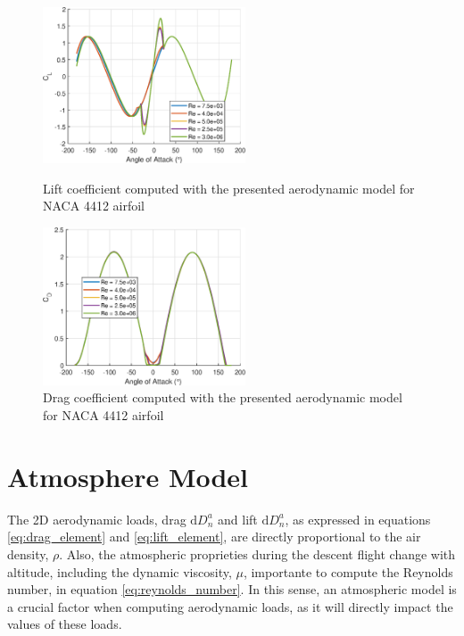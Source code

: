 \begin{figure}[!htb]
    \centering
	\begin{minipage}{0.49\textwidth}
		\centering
		\includegraphics[width=6cm]{Figures/background/aero/cl_naca4412.eps}
		\caption{Lift coefficient computed with the presented aerodynamic model for NACA 4412 airfoil}
		\label{fig:cl_naca4412}
	\end{minipage}
    \hfill
    \begin{minipage}{0.49\textwidth}
		\centering
		\includegraphics[width=6cm]{Figures/background/aero/cd_naca4412.eps}
		\caption{Drag coefficient computed with the presented aerodynamic model for NACA 4412 airfoil} 
		\label{fig:cd_naca4412}
	\end{minipage}
\end{figure}





\section{Atmosphere Model}
\label{section:atmosphere_model}

The 2D aerodynamic loads, drag $\mathrm{d}D^a_n$ and lift $\mathrm{d}D^a_n$, as expressed in equations \ref{eq:drag_element} and \ref{eq:lift_element}, are directly proportional to the air density, $\rho$. Also, the atmospheric proprieties during the descent flight change with altitude, including the dynamic viscosity, $\mu$, importante to compute the Reynolds number, in equation \ref{eq:reynolds_number}. In this sense, an atmospheric model is a crucial factor when computing aerodynamic loads, as it will directly impact the values of these loads. 

